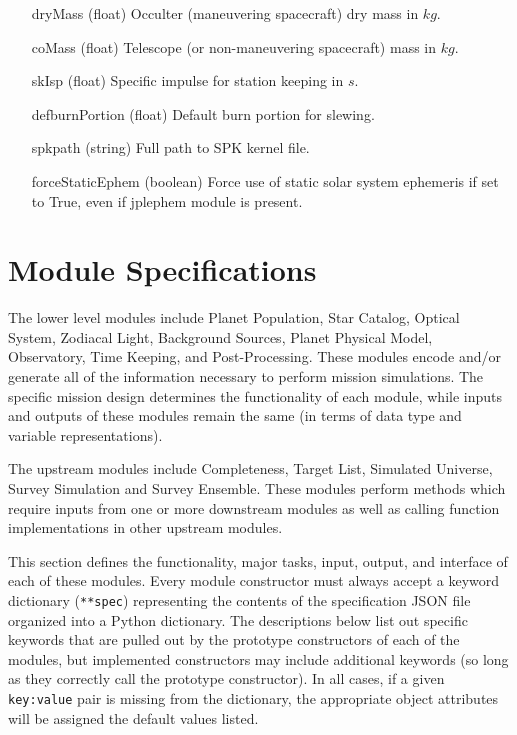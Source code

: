 \documentclass[cleanfoot]{asme2ej}
\begin{document}
\begin{itemize}[leftmargin=1in,font={\ttfamily}]
\item[dryMass] (float) Occulter (maneuvering spacecraft) dry mass in $ kg $. 
\item[coMass] (float) Telescope (or non-maneuvering spacecraft) mass in $ kg $. 
\item[skIsp] (float) Specific impulse for station keeping in $ s $. 
\item[defburnPortion] (float) Default burn portion for slewing.
\item[spkpath] (string) Full path to SPK kernel file.
\item[forceStaticEphem]  (boolean) Force use of static solar system ephemeris if set to True, even if jplephem module is present.
\end{itemize}


\section{Module Specifications}\label{sec:modules}
The lower level modules include Planet Population, Star Catalog, Optical System, Zodiacal Light, Background Sources, Planet Physical Model, Observatory, Time Keeping, and Post-Processing.  These modules encode and/or generate all of the information necessary to perform mission simulations.  The specific mission design determines the functionality of each module, while inputs and outputs of these modules remain the same (in terms of data type and variable representations).  

The upstream modules include Completeness, Target List, Simulated Universe, Survey Simulation and Survey Ensemble. These modules perform methods which require inputs from one or more downstream modules as well as calling function implementations in other upstream modules. 

This section defines the functionality, major tasks, input, output, and interface of each of these modules. Every module constructor must always accept a keyword dictionary (\verb+**spec+) representing the contents of the specification JSON file organized into a Python dictionary. The descriptions below list out specific keywords that are pulled out by the prototype constructors of each of the modules, but implemented constructors may include additional keywords (so long as they correctly call the prototype constructor).  In all cases, if a given \verb+key:value+ pair is missing from the dictionary, the appropriate object attributes will be assigned the default values listed.


\end{document}

